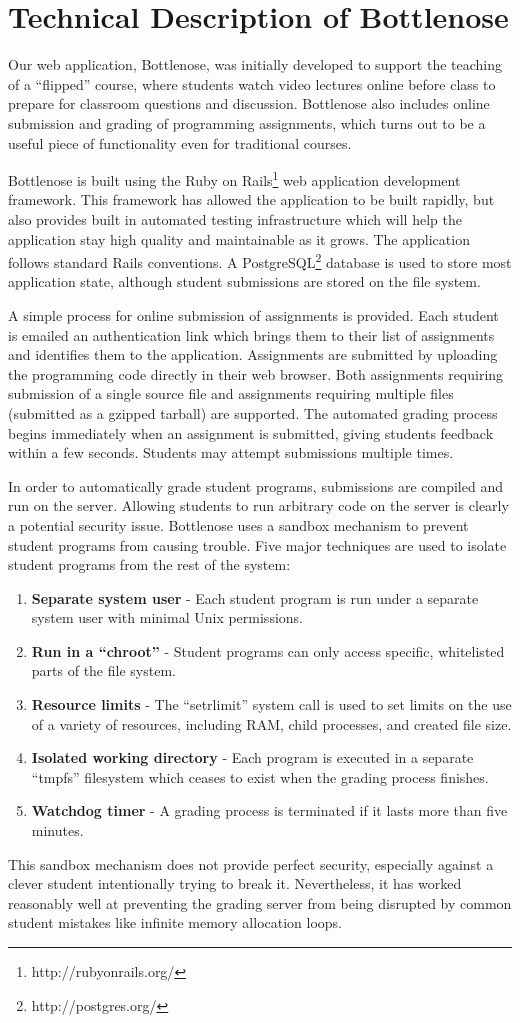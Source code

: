 \section{Technical Description of Bottlenose}

Our web application, Bottlenose, was initially developed to support
the teaching of a ``flipped'' course, where students watch video
lectures online before class to prepare for classroom questions and
discussion. Bottlenose also includes online submission and grading of
programming assignments, which turns out to be a useful piece of
functionality even for traditional courses.

Bottlenose is built using the Ruby on
Rails\footnote{http://rubyonrails.org/} web application development
framework. This framework has allowed the application to be built
rapidly, but also provides built in automated testing infrastructure
which will help the application stay high quality and maintainable as
it grows. The application follows standard Rails conventions. A
PostgreSQL\footnote{http://postgres.org/} database is used to store
most application state, although student submissions are stored on the
file system.

A simple process for online submission of assignments is
provided. Each student is emailed an authentication link which brings
them to their list of assignments and identifies them to the
application. Assignments are submitted by uploading the programming
code directly in their web browser. Both assignments requiring
submission of a single source file and assignments requiring multiple
files (submitted as a gzipped tarball) are supported. The automated
grading process begins immediately when an assignment is submitted,
giving students feedback within a few seconds.  Students may attempt
submissions multiple times.

In order to automatically grade student programs, submissions are
compiled and run on the server. Allowing students to run arbitrary
code on the server is clearly a potential security issue.  Bottlenose
uses a sandbox mechanism to prevent student programs from causing
trouble. Five major techniques are used to isolate student programs
from the rest of the system:

\begin{enumerate}
\item \textbf{Separate system user} - Each student program is run under 
  a separate system user with minimal Unix permissions.
\item \textbf{Run in a ``chroot''} - Student programs can only access
  specific, whitelisted parts of the file system.
\item \textbf{Resource limits} - The ``setrlimit'' system call is used to
  set limits on the use of a variety of resources, including RAM, child
  processes, and created file size.
\item \textbf{Isolated working directory} - Each program is executed in
  a separate ``tmpfs'' filesystem which ceases to exist when the grading
  process finishes.
\item \textbf{Watchdog timer} - A grading process is terminated if it lasts
  more than five minutes.
\end{enumerate}

This sandbox mechanism does not provide perfect security, especially
against a clever student intentionally trying to break
it. Nevertheless, it has worked reasonably well at preventing the
grading server from being disrupted by common student mistakes like
infinite memory allocation loops.
